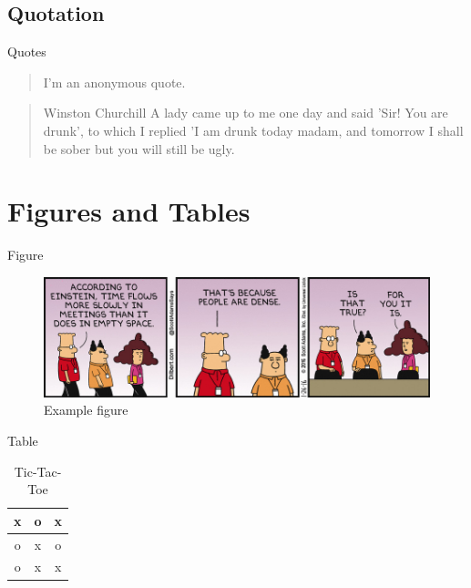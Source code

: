 \documentclass[aspectratio=169,envcountsect]{beamer}    %
\begin{document}
\subsection{Quotation}
\begin{frame}{Quotes}
	\begin{quote}{}
		I'm an anonymous quote.
	\end{quote}
	\begin{quote}{Winston Churchill}
		A lady came up to me one day and said 'Sir! You are drunk', to which I replied 'I am drunk today madam, and tomorrow I shall be sober but you will still be ugly.
	\end{quote}
\end{frame}

\section{Figures and Tables}
\begin{frame}{Figure}
	\begin{figure}[h]
		\centering
		\includegraphics[width=.8\textwidth]{images/example}
		\caption{Example figure}
		\label{fig:ex1}
	\end{figure}	
\end{frame}

\begin{frame}{Table}
	\begin{table}[h]
		\centering
		\caption{Tic-Tac-Toe}
		\label{tab:tictactoe}
		\begin{tabular}{|c|c|c|}
			\hline
			x & o & x\\\hline
			o & x & o\\\hline
			o & x & x\\\hline
		\end{tabular}
	\end{table}	
\end{frame}
\end{document}
